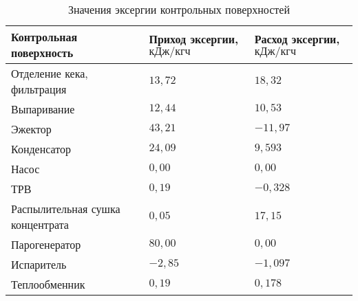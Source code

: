 \begin{longtable}{|X|Y|Y|}
\caption{\label{tab:exergy_sheme}Значения эксергии контрольных поверхностей}
\tabularnewline
\hline
Контрольная поверхность & Приход эксергии, ${{ кДж}}/{{ кгч}}$ & Расход эксергии, ${{ кДж}}/{{ кгч}}$ \\ \hline 
Отделение кека, фильтрация & \(13,72\) & \(18,32\) \\ \hline 
Выпаривание & \(12,44\) & \(10,53\) \\ \hline 
Эжектор & \(43,21\) & \(-11,97\) \\ \hline 
Конденсатор & \(24,09\) & \(9,593\) \\ \hline 
Насос & \(0,00\) & \(0,00\) \\ \hline 
ТРВ & \(0,19\) & \(-0,328\) \\ \hline 
Распылительная сушка концентрата & \(0,05\) & \(17,15\) \\ \hline 
Парогенератор & \(80,00\) & \(0,00\) \\ \hline 
Испаритель & \(-2,85\) & \(-1,097\) \\ \hline 
Теплообменник & \(0,19\) & \(0,178\) \\ \hline 
\end{longtable}%
